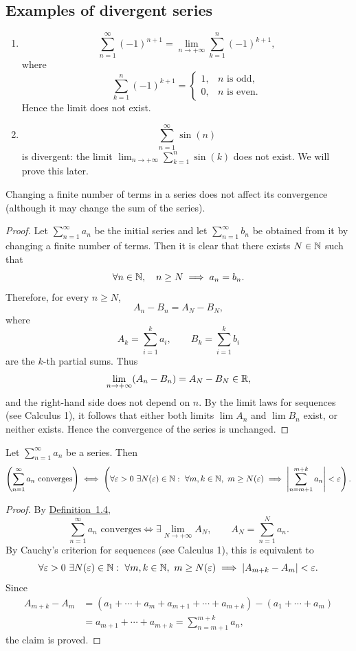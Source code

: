 \subsection*{Examples of divergent series}
\begin{enumerate}[label=\arabic*)]
\item
\[
\sum_{n=1}^{\infty}(-1)^{n+1}
=\lim_{n\to+\infty}\sum_{k=1}^{n}(-1)^{k+1},
\]
where
\[
\sum_{k=1}^{n}(-1)^{k+1}
=
\begin{cases}
1, & n\text{ is odd},\\
0, & n\text{ is even}.
\end{cases}
\]
Hence the limit does not exist.

\item
\[
\sum_{n=1}^{\infty}\sin(n)
\]
is divergent: the limit $\lim_{n\to+\infty}\sum_{k=1}^{n}\sin(k)$ does not exist. We will prove this later.
\end{enumerate}

\begin{claim}\label{claim:1.1}
Changing a finite number of terms in a series does not affect its convergence (although it may change the sum of the series).
\end{claim}

\begin{proof}
Let $\sum_{n=1}^{\infty}a_n$ be the initial series and let $\sum_{n=1}^{\infty}b_n$ be obtained from it by changing a finite number of terms. Then it is clear that there exists $N\in\mathbb{N}$ such that
\[
\forall n\in\mathbb{N},\quad n\ge N\implies a_n=b_n.
\]
Therefore, for every $n\ge N$,
\[
A_n-B_n=A_N-B_N,
\]
where
\[
A_k=\sum_{i=1}^{k}a_i,
\qquad
B_k=\sum_{i=1}^{k}b_i
\]
are the $k$-th partial sums. Thus
\[
\lim_{n\to+\infty}(A_n-B_n)=A_N-B_N\in\mathbb{R},
\]
and the right-hand side does not depend on $n$. By the limit laws for sequences (see Calculus 1), it follows that either both limits $\lim A_n$ and $\lim B_n$ exist, or neither exists. Hence the convergence of the series is unchanged.
\end{proof}

\begin{claim}\label{claim:1.2}
Let $\sum_{n=1}^{\infty}a_n$ be a series. Then
\[
\left(\sum_{n=1}^{\infty}a_n\text{ converges}\right)
\iff
\left(
\forall\varepsilon>0\ \exists N(\varepsilon)\in\mathbb{N}:\
\forall m,k\in\mathbb{N},\ m\ge N(\varepsilon)
\implies
\left|\sum_{n=m+1}^{m+k}a_n\right|<\varepsilon
\right).
\]
\end{claim}

\begin{proof}
By \hyperref[def:1.4]{Definition~1.4},
\[
\sum_{n=1}^{\infty}a_n\text{ converges}
\iff
\exists\lim_{N\to+\infty}A_N,
\qquad
A_N=\sum_{n=1}^{N}a_n.
\]
By Cauchy's criterion for sequences (see Calculus 1), this is equivalent to
\[
\forall\varepsilon>0\ \exists N(\varepsilon)\in\mathbb{N}:\
\forall m,k\in\mathbb{N},\ m\ge N(\varepsilon)
\implies |A_{m+k}-A_m|<\varepsilon.
\]
Since
\begin{align*}
A_{m+k}-A_m
&=(a_1+\cdots+a_m+a_{m+1}+\cdots+a_{m+k})-(a_1+\cdots+a_m)\\
&=a_{m+1}+\cdots+a_{m+k}
=\sum_{n=m+1}^{m+k}a_n,
\end{align*}
the claim is proved.
\end{proof}

